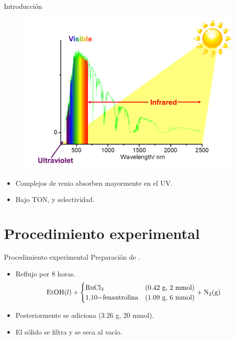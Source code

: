 \documentclass[handout]{beamer}
\begin{document}
\begin{frame}{Introducci\'on}
	\begin{figure}[h]
		\centering
		\includegraphics[width=0.8\linewidth]{sources/spectrum}
	\end{figure}
	\begin{itemize}
		\item Complejos de renio absorben mayormente en el UV.
		\item Bajo TON, y selectividad.
	\end{itemize}
\end{frame}

\section{Procedimiento experimental}
\begin{frame}{Procedimiento experimental}
	Preparaci\'on de .
	\begin{itemize}
		\item Reflujo por 8 horas.
		\begin{equation*}
			\ce{EtOH}(l) + 
			\begin{cases}
				\ce{RuCl3} &  \text{(0.42 g, 2 mmol)} \\
				\ce{1,10-fenantrolina} & \text{(1.09 g, 6 mmol)}
			\end{cases}
			+ \ce{N2(g)}
		\end{equation*}
		\item Posteriormente se adiciona  (3.26 g, 20 mmol).
		\item El s\'olido se filtra y se seca al vac\'io.
	\end{itemize}
\end{frame}
\end{document}
